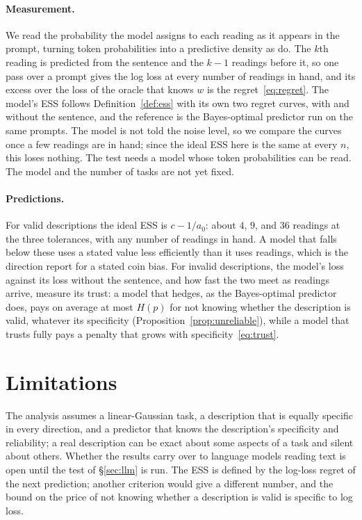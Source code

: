 \documentclass[10pt]{article}
\begin{document}
\paragraph{Measurement.} We read the probability the model assigns to each reading as it appears in the prompt, turning token probabilities into a predictive density as \citet{requeima2024} do. The $k$th reading is predicted from the sentence and the $k - 1$ readings before it, so one pass over a prompt gives the log loss at every number of readings in hand, and its excess over the loss of the oracle that knows $w$ is the regret~\eqref{eq:regret}. The model's ESS follows Definition~\ref{def:ess} with its own two regret curves, with and without the sentence, and the reference is the Bayes-optimal predictor run on the same prompts. The model is not told the noise level, so we compare the curves once a few readings are in hand; since the ideal ESS here is the same at every $n$, this loses nothing. The test needs a model whose token probabilities can be read. The model and the number of tasks are not yet fixed.

\paragraph{Predictions.} For valid descriptions the ideal ESS is $c - 1/a_0$: about $4$, $9$, and $36$ readings at the three tolerances, with any number of readings in hand. A model that falls below these uses a stated value less efficiently than it uses readings, which is the direction \citet{gupta2025} report for a stated coin bias. For invalid descriptions, the model's loss against its loss without the sentence, and how fast the two meet as readings arrive, measure its trust: a model that hedges, as the Bayes-optimal predictor does, pays on average at most $H(p)$ for not knowing whether the description is valid, whatever its specificity (Proposition~\ref{prop:unreliable}), while a model that trusts fully pays a penalty that grows with specificity~\eqref{eq:trust}.

\section{Limitations}
The analysis assumes a linear-Gaussian task, a description that is equally specific in every direction, and a predictor that knows the description's specificity and reliability; a real description can be exact about some aspects of a task and silent about others. Whether the results carry over to language models reading text is open until the test of \S\ref{sec:llm} is run. The ESS is defined by the log-loss regret of the next prediction; another criterion would give a different number, and the bound on the price of not knowing whether a description is valid is specific to log loss.
\end{document}
